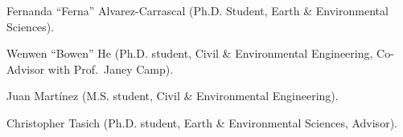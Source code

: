 \item Fernanda ``Ferna'' Alvarez-Carrascal (Ph.D. Student, Earth \& Environmental Sciences).
\item Wenwen ``Bowen'' He (Ph.D. student, Civil \& Environmental Engineering, Co-Advisor with Prof.\ Janey Camp).
\item Juan Mart\'inez (M.S. student, Civil \& Environmental Engineering).
\item Christopher Tasich (Ph.D. student, Earth \& Environmental Sciences, Advisor).
